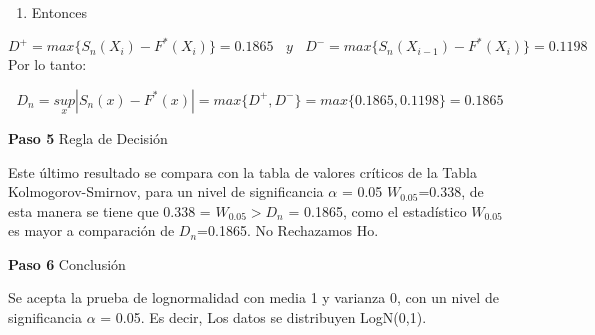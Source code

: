 \documentclass[a4paper,oneside,openany]{book}
\providecommand{\tightlist}{%
  \setlength{\itemsep}{0pt}\setlength{\parskip}{0pt}}
\begin{document}
\begin{enumerate}
\def\labelenumi{\arabic{enumi})}
\setcounter{enumi}{7}
\tightlist
\item
  Entonces
\end{enumerate}

\[ D^+= max \{ S_{n}(X_{i})-F^*(X_{i})\}= 0.1865 \ \ \ \ y\ \ \ \ D^-= max \{ S_{n}(X_{i-1})-F^*(X_{i})\}=0.1198\]
Por lo tanto:

\[D_{n}=\underset{x}{sup}|S_{n}(x)-F^*(x)|=max\{ D^+,D^-\}=max\{ 0.1865,0.1198\}=0.1865\]

\textbf{Paso 5} Regla de Decisión

Este último resultado se compara con la tabla de valores críticos de la
Tabla Kolmogorov-Smirnov, para un nivel de significancia \(\alpha\) =
0.05 \(W_{0.05}\)=0.338, de esta manera se tiene que 0.338 =
\(W_{0.05} > D_{n}\) = 0.1865, como el estadístico \(W_{0.05}\) es mayor
a comparación de \(D_{n}\)=0.1865. No Rechazamos Ho.

\textbf{Paso 6} Conclusión

Se acepta la prueba de lognormalidad con media 1 y varianza 0, con un
nivel de significancia \(\alpha\) = 0.05. Es decir, Los datos se
distribuyen LogN(0,1).
\end{document}
